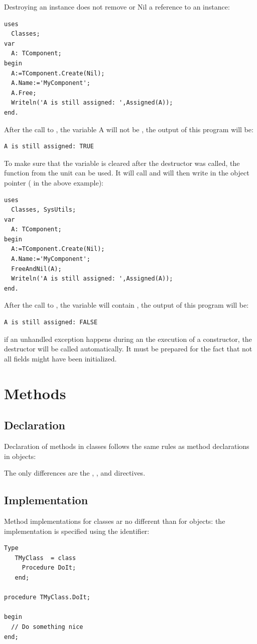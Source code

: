Destroying an instance does not remove or Nil a reference to an instance:
\begin{verbatim}
uses
  Classes;
var
  A: TComponent;
begin
  A:=TComponent.Create(Nil);
  A.Name:='MyComponent';
  A.Free;
  Writeln('A is still assigned: ',Assigned(A));
end.
\end{verbatim}
After the call to , the variable A will not be , the
output of this program will be:
\begin{verbatim}
A is still assigned: TRUE
\end{verbatim}
To make sure that the variable  is cleared after the destructor was called,
the function  from the  unit can be used. It
will call  and will then write  in the object pointer (
in the above example):
\begin{verbatim}
uses
  Classes, SysUtils;
var
  A: TComponent;
begin
  A:=TComponent.Create(Nil);
  A.Name:='MyComponent';
  FreeAndNil(A);
  Writeln('A is still assigned: ',Assigned(A));
end.
\end{verbatim}
After the call to , the variable  will contain , the
output of this program will be:
\begin{verbatim}
A is still assigned: FALSE
\end{verbatim}

\begin{remark}
if an unhandled exception happens during an the execution of a constructor,
the destructor will be called automatically. It must be prepared for the fact
that not all fields might have been initialized.
\end{remark}

\section{Methods}
\subsection{Declaration}
Declaration of methods in classes follows the same rules as method
declarations in objects:

The only differences are the , ,  and
 directives.

\subsection{Implementation}
Method implementations for classes ar no different than for objects:
the implementation is specified using the  identifier:
\begin{verbatim}
Type
   TMyClass  = class
     Procedure DoIt;
   end;

procedure TMyClass.DoIt;

begin
  // Do something nice
end;
\end{verbatim}

